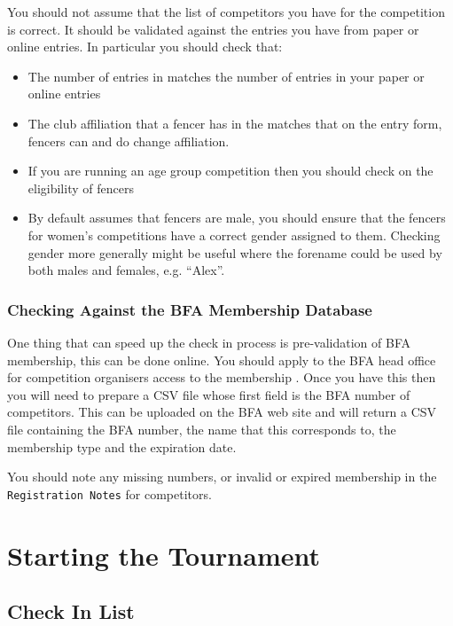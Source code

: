 \documentclass[a4paper,11pt]{memoir}
\begin{document}
You should not assume that the list of competitors you have for the competition is correct. It should be validated against the entries you have from paper or online entries. In particular you should check that:

\begin{itemize}
 \item The number of entries in \fencingtime{} matches the number of entries in your paper or online entries
 \item The club affiliation that a fencer has in the \fencingtime{}  matches that on the entry form, fencers can and do change affiliation.
 \item If you are running an age group competition then you should check on the eligibility of fencers
 \item By default \fencingtime{} assumes that fencers are male, you should ensure that the fencers for women's competitions have a correct gender assigned to them. Checking gender more generally might be useful where the forename could be used by both males and females, e.g. “Alex”.
\end{itemize}

\subsection{Checking Against the BFA Membership Database}

One thing that can speed up the check in process is pre-validation of BFA membership, this can be done online. You should apply to the BFA head office for competition organisers access to the membership . Once you have this then you will need to prepare a CSV file whose first field is the BFA number of competitors. This can be uploaded on the BFA web site and will return a CSV file containing the BFA number, the name that this corresponds to, the membership type and the expiration date. 

You should note any missing numbers, or invalid or expired membership in the \texttt{Registration Notes} for competitors. 

\chapter{Starting the Tournament}

\section{Check In List}
\end{document}
